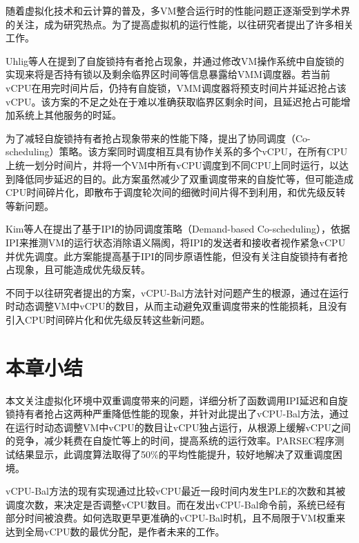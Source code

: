 随着虚拟化技术和云计算的普及，多VM整合运行时的性能问题正逐渐受到学术界的关注，成为研究热点。为了提高虚拟机的运行性能，以往研究者提出了许多相关工作\cite{rao2014towards}。

Uhlig等人在\cite{uhlig2004towards}提到了自旋锁持有者抢占现象，并通过修改VM操作系统中自旋锁的实现来将是否持有锁以及剩余临界区时间等信息暴露给VMM调度器。若当前vCPU在用完时间片后，仍持有自旋锁，VMM调度器将预支时间片并延迟抢占该vCPU。该方案的不足之处在于难以准确获取临界区剩余时间，且延迟抢占可能增加系统上其他服务的时延。

为了减轻自旋锁持有者抢占现象带来的性能下降，\cite{weng2009hybrid}\cite{sukwong2011co}\cite{bai2010task}提出了协同调度（Co-scheduling）策略。该方案同时调度相互具有协作关系的多个vCPU，在所有CPU上统一划分时间片，并将一个VM中所有vCPU调度到不同CPU上同时运行，以达到降低同步延迟的目的。此方案虽然减少了双重调度带来的自旋忙等，但可能造成CPU时间碎片化，即散布于调度轮次间的细微时间片得不到利用，和优先级反转等新问题。

Kim等人在\cite{kim2013demand}提出了基于IPI的协同调度策略（Demand-based Co-scheduling），依据IPI来推测VM的运行状态消除语义隔阂，将IPI的发送者和接收者视作紧急vCPU并优先调度。此方案能提高基于IPI的同步原语性能，但没有关注自旋锁持有者抢占现象，且可能造成优先级反转。

不同于以往研究者提出的方案，vCPU-Bal方法针对问题产生的根源，通过在运行时动态调整VM中vCPU的数目，从而主动避免双重调度带来的性能损耗，且没有引入CPU时间碎片化和优先级反转这些新问题。



\section{本章小结}

本文关注虚拟化环境中双重调度带来的问题，详细分析了函数调用IPI延迟和自旋锁持有者抢占这两种严重降低性能的现象，并针对此提出了vCPU-Bal方法，通过在运行时动态调整VM中vCPU的数目让vCPU独占运行，从根源上缓解vCPU之间的竞争，减少耗费在自旋忙等上的时间，提高系统的运行效率。PARSEC程序测试结果显示，此调度算法取得了50\%的平均性能提升，较好地解决了双重调度困境。

vCPU-Bal方法的现有实现通过比较vCPU最近一段时间内发生PLE的次数和其被调度次数，来决定是否调整vCPU数目。而在发出vCPU-Bal命令前，系统已经有部分时间被浪费。如何选取更早更准确的vCPU-Bal时机，且不局限于VM权重来达到全局vCPU数的最优分配，是作者未来的工作。